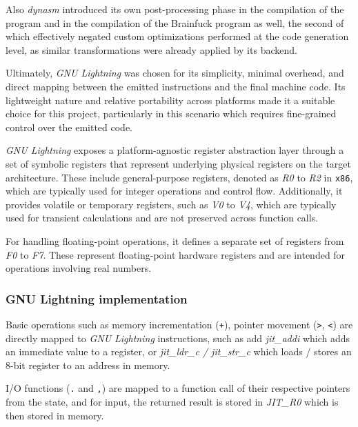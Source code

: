 \par Also \textit{dynasm} introduced its own post-processing phase in the compilation of the program and in the compilation of the Brainfuck program as well, the second of which effectively negated custom optimizations performed at the code generation level, as similar transformations were already applied by its backend.

\par Ultimately, \textit{GNU Lightning} was chosen for its simplicity, minimal overhead, and direct mapping between the emitted instructions and the final machine code. Its lightweight nature and relative portability across platforms made it a suitable choice for this project, particularly in this scenario which requires fine-grained control over the emitted code.

\par \textit{GNU Lightning} exposes a platform-agnostic register abstraction layer through a set of symbolic registers that represent underlying physical registers on the target architecture. These include general-purpose registers, denoted as \textit{R0} to \textit{R2} in \texttt{x86}, which are typically used for integer operations and control flow. Additionally, it provides volatile or temporary registers, such as \textit{V0} to \textit{V4}, which are typically used for transient calculations and are not preserved across function calls.

\par For handling floating-point operations, it defines a separate set of registers from \textit{F0} to \textit{F7}. These represent floating-point hardware registers and are intended for operations involving real numbers.

\subsubsection{GNU Lightning implementation}
\label{sec:ch2sec2sub2sec2}

\par Basic operations such as memory incrementation (\texttt{+}), pointer movement (\texttt{>}, \texttt{<}) are directly mapped to \textit{GNU Lightning} instructions, such as add \textit{jit\_addi} which adds an immediate value to a register, or \textit{jit\_ldr\_c / jit\_str\_c} which loads / stores an 8-bit register to an address in memory.

\par I/O functions (\texttt{.} and \texttt{,}) are mapped to a function call of their respective pointers from the state, and for input, the returned result is stored in \textit{JIT\_R0} which is then stored in memory.


